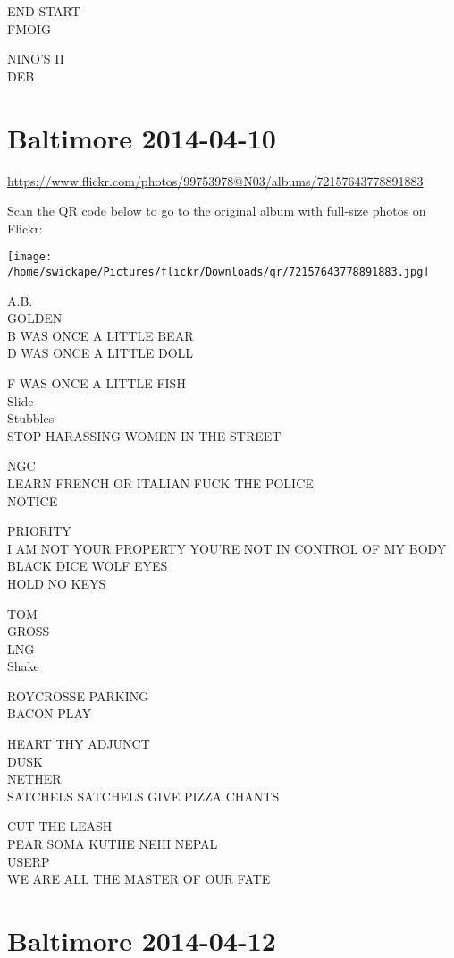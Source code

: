 \documentclass[10pt,letterpaper]{article}
\begin{document}
END START\\
FMOIG

NINO'S II\\
DEB


\section*{Baltimore 2014-04-10}

\url{https://www.flickr.com/photos/99753978@N03/albums/72157643778891883}

Scan the QR code below to go to the original album with full-size photos on Flickr:

\texttt{[image: /home/swickape/Pictures/flickr/Downloads/qr/72157643778891883.jpg]}


A.B.\\
GOLDEN\\
B WAS ONCE A LITTLE BEAR\\
D WAS ONCE A LITTLE DOLL

F WAS ONCE A LITTLE FISH\\
Slide\\
Stubbles\\
STOP HARASSING WOMEN IN THE STREET

NGC\\
LEARN FRENCH OR ITALIAN FUCK THE POLICE\\
NOTICE

PRIORITY\\
I AM NOT YOUR PROPERTY YOU'RE NOT IN CONTROL OF MY BODY\\
BLACK DICE WOLF EYES\\
HOLD NO KEYS

TOM\\
GROSS\\
LNG\\
Shake

ROYCROSSE PARKING\\
BACON PLAY

HEART THY ADJUNCT\\
DUSK\\
NETHER\\
SATCHELS SATCHELS GIVE PIZZA CHANTS

CUT THE LEASH\\
PEAR SOMA KUTHE NEHI NEPAL\\
USERP\\
WE ARE ALL THE MASTER OF OUR FATE


\section*{Baltimore 2014-04-12}
\end{document}
